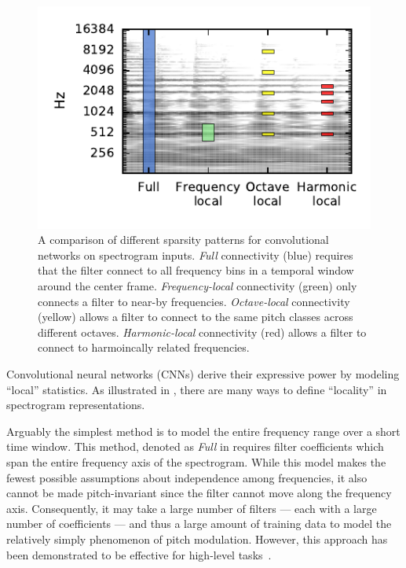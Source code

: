 \documentclass{article}
\begin{document}
\begin{figure}
    \includegraphics[width=\columnwidth]{figs/filter-shapes}
    \caption{A comparison of different sparsity patterns for convolutional networks on spectrogram inputs.
        \emph{Full} connectivity (blue) requires that the filter connect to all frequency bins in a temporal window around the center frame.
        \emph{Frequency-local} connectivity (green) only connects a filter to near-by frequencies.
        \emph{Octave-local} connectivity (yellow) allows a filter to connect to the same pitch classes across different octaves.
        \emph{Harmonic-local} connectivity (red) allows a filter to connect to harmoincally related frequencies.}
\label{figs:filter-shapes}
\end{figure}
Convolutional neural networks (CNNs) derive their expressive power by modeling ``local'' statistics.
As illustrated in , there are many ways to define ``locality'' in spectrogram representations.

Arguably the simplest method is to model the entire frequency range over a short time window.  
This method, denoted as \emph{Full} in  requires filter coefficients which span the entire frequency axis of the spectrogram.
While this model makes the fewest possible assumptions about independence among frequencies, it also cannot be made pitch-invariant since the filter cannot move along the frequency axis.
Consequently, it may take a large number of filters --- each with a large number of coefficients --- and thus a large amount of training data to model the relatively simply phenomenon of pitch modulation.
However, this approach has been demonstrated to be effective for high-level tasks~\cite{van2013deep}.
\end{document}
